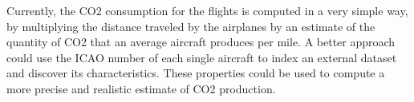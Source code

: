 \documentclass{vldb}
\begin{document}
Currently, the CO2 consumption for the flights is computed in a very simple way,
by multiplying the distance traveled by the airplanes by an estimate of the
quantity of CO2 that an average aircraft produces per mile. A better approach
could use the ICAO number of each single aircraft to index an external dataset
and discover its characteristics. These properties could be used to compute a
more precise and realistic estimate of CO2 production.

\end{document}
